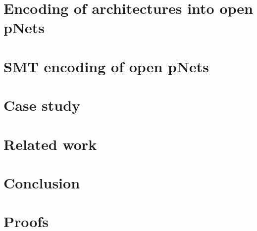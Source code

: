 \documentclass{llncs}
\begin{document}
\section{Encoding of architectures into open pNets}
\label{secn:encoding}


\section{SMT encoding of open pNets}
\label{secn:smt}


\section{Case study}
\label{secn:case-study}


\section{Related work}
\label{secn:related}


\section{Conclusion}
\label{secn:conclusion}





\appendix
\clearpage

\section{Proofs}
\end{document}
